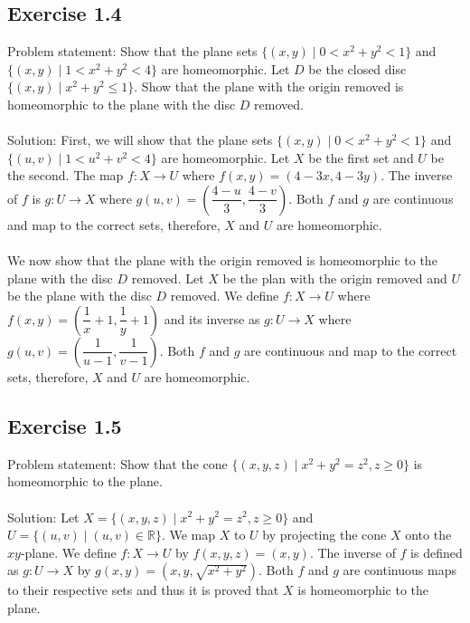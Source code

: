 \documentclass{article}
\begin{document}
\subsection*{Exercise 1.4}
Problem statement: Show that the plane sets $\{(x,y) \mid 0 < x^2 + y^2 < 1 \}$ and $\{(x,y) \mid 1 < x^2 + y^2 < 4 \}$ are homeomorphic. Let $D$ be the closed disc $\{(x,y) \mid x^2 + y^2 \leq 1 \}$. Show that the plane with the origin removed is homeomorphic to the plane with the disc $D$ removed. \\\\
Solution: First, we will show that the plane sets $\{(x,y) \mid 0 < x^2 + y^2 < 1 \}$ and $\{(u,v) \mid 1 < u^2 + v^2 < 4 \}$ are homeomorphic. Let $X$ be the first set and $U$ be the second. The map $f: X \to U$ where $f(x,y)= (4-3x, 4-3y)$. The inverse of $f$ is $g: U \to X$ where $g(u,v)=(\dfrac{4-u}{3}, \dfrac{4-v}{3})$. Both $f$ and $g$ are continuous and map to the correct sets, therefore, $X$ and $U$ are homeomorphic. \\\\
We now show that the plane with the origin removed is homeomorphic to the plane with the disc $D$ removed. Let $X$ be the plan with the origin removed and $U$ be the plane with the disc $D$ removed. We define $f: X \to U$ where $f(x,y)= (\dfrac{1}{x} + 1, \dfrac{1}{y} + 1)$ and its inverse as $g: U \to X$ where $g(u,v)= (\dfrac{1}{u-1}, \dfrac{1}{v-1})$. Both $f$ and $g$ are continuous and map to the correct sets, therefore, $X$ and $U$ are homeomorphic.

\subsection*{Exercise 1.5}
Problem statement: Show that the cone $\{ (x,y,z) \mid x^2 + y^2 = z^2, z \geq 0 \}$ is homeomorphic to the plane. \\\\
Solution: Let $X=\{ (x,y,z) \mid x^2 + y^2 = z^2, z \geq 0 \}$ and $U=\{ (u,v) \mid (u,v) \in \mathbb{R} \}$. We map $X$ to $U$ by projecting the cone $X$ onto the $xy$-plane. We define $f: X \to U$ by $f(x,y,z)= (x,y)$. The inverse of $f$ is defined as $g: U \to X$ by $g(x,y)= (x,y,\sqrt{x^2 + y^2})$. Both $f$ and $g$ are continuous maps to their respective sets and thus it is proved that $X$ is homeomorphic to the plane.
\end{document}
